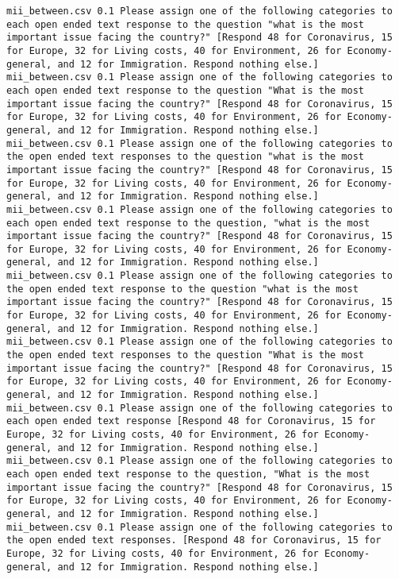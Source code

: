 \begin{lstlisting}[label=lst:promptvariants]
mii_between.csv	0.1	Please assign one of the following categories to each open ended text response to the question "what is the most important issue facing the country?" [Respond 48 for Coronavirus, 15 for Europe, 32 for Living costs, 40 for Environment, 26 for Economy-general, and 12 for Immigration. Respond nothing else.]
mii_between.csv	0.1	Please assign one of the following categories to each open ended text response to the question "What is the most important issue facing the country?" [Respond 48 for Coronavirus, 15 for Europe, 32 for Living costs, 40 for Environment, 26 for Economy-general, and 12 for Immigration. Respond nothing else.]
mii_between.csv	0.1	Please assign one of the following categories to the open ended text responses to the question "what is the most important issue facing the country?" [Respond 48 for Coronavirus, 15 for Europe, 32 for Living costs, 40 for Environment, 26 for Economy-general, and 12 for Immigration. Respond nothing else.]
mii_between.csv	0.1	Please assign one of the following categories to each open ended text response to the question, "what is the most important issue facing the country?" [Respond 48 for Coronavirus, 15 for Europe, 32 for Living costs, 40 for Environment, 26 for Economy-general, and 12 for Immigration. Respond nothing else.]
mii_between.csv	0.1	Please assign one of the following categories to the open ended text response to the question "what is the most important issue facing the country?" [Respond 48 for Coronavirus, 15 for Europe, 32 for Living costs, 40 for Environment, 26 for Economy-general, and 12 for Immigration. Respond nothing else.]
mii_between.csv	0.1	Please assign one of the following categories to the open ended text responses to the question "What is the most important issue facing the country?" [Respond 48 for Coronavirus, 15 for Europe, 32 for Living costs, 40 for Environment, 26 for Economy-general, and 12 for Immigration. Respond nothing else.]
mii_between.csv	0.1	Please assign one of the following categories to each open ended text response [Respond 48 for Coronavirus, 15 for Europe, 32 for Living costs, 40 for Environment, 26 for Economy-general, and 12 for Immigration. Respond nothing else.]
mii_between.csv	0.1	Please assign one of the following categories to each open ended text response to the question, "What is the most important issue facing the country?" [Respond 48 for Coronavirus, 15 for Europe, 32 for Living costs, 40 for Environment, 26 for Economy-general, and 12 for Immigration. Respond nothing else.]
mii_between.csv	0.1	Please assign one of the following categories to the open ended text responses. [Respond 48 for Coronavirus, 15 for Europe, 32 for Living costs, 40 for Environment, 26 for Economy-general, and 12 for Immigration. Respond nothing else.]

\end{lstlisting}
